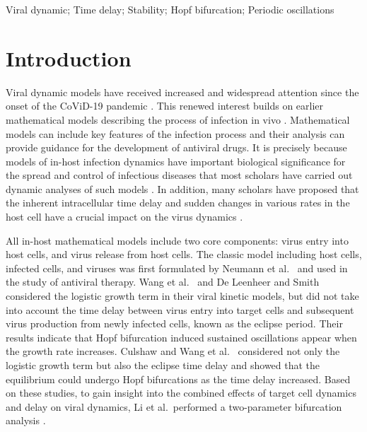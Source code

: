\documentclass{CMHPhD-SIVD}
\begin{document}
\begin{keywords}
Viral dynamic; Time delay; Stability; Hopf bifurcation; Periodic oscillations
\end{keywords}


\linenumbers

\section{Introduction}
Viral dynamic models have received increased and widespread attention since the onset of the CoViD-19 pandemic \cite{zu2021investigating,wang2021effects,tang2022controlling,qian2020modelling}.
This renewed interest builds on earlier mathematical models describing the process of infection in vivo \cite{smith2003virus,wang2006mathematical,li2012joint,mojaver2015mathematical,pan2019rich}.
Mathematical models can include key features of the infection process and their analysis can provide guidance for the development of antiviral drugs. It is precisely because models of in-host infection dynamics have important biological significance for the spread and control of infectious diseases that most scholars have carried out dynamic analyses of such models \cite{li2010global,li2010impact,shu2014sustained}. In addition, many scholars have proposed that the inherent intracellular time delay and sudden changes in various rates in the host cell have a crucial impact on the virus dynamics \cite{culshaw2000delay,huang2010lyapunov,vargas2012stability,shu2015delay,pertsev2019stochastic,lu2021mathematical}.

All in-host mathematical models include two core components: virus entry into host cells, and virus release from host cells. The classic model including host cells, infected cells, and viruses was first formulated by Neumann et al.\ \cite{neumann1998hepatitis} and used in the study of antiviral therapy. Wang et al.\ \cite{wang2006mathematical} and De Leenheer and Smith \cite{smith2003virus} considered the logistic growth term in their viral kinetic models, but did not take into account the time delay between virus entry into target cells and subsequent virus production from newly infected cells, known as the eclipse period. Their results indicate that Hopf bifurcation induced sustained oscillations appear when the growth rate increases.
Culshaw \cite{culshaw2000delay} and Wang et al.\ \cite{wang2009oscillatory} considered not only the logistic growth term but also the eclipse time delay and showed that the equilibrium could undergo Hopf bifurcations as the time delay increased. Based on these studies, to gain insight into the combined effects of target cell dynamics and delay on viral dynamics, Li et al.\ performed a two-parameter bifurcation analysis \cite{li2012joint}.
\end{document}
